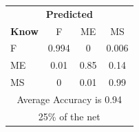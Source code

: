 \documentclass[12pt]{article} %
\begin{document}
\begin{minipage}{0.5\textwidth}
\begin{center}
\begin{tabular}{l|c|c|c|}
 \multicolumn{4}{c}{ \textbf{ Predicted}}\\
 \textbf{Know}&F&ME&MS\\ \hline\hline
F   &0.994&0&0.006\\
ME &0.01&0.85&0.14\\
MS &0&0.01&0.99\\
\multicolumn{4}{c}{Average Accuracy is 0.94}\\
\multicolumn{4}{c}{25\%  of the net}\\
\end{tabular}
\end{center}
\end{minipage}
\end{document}

